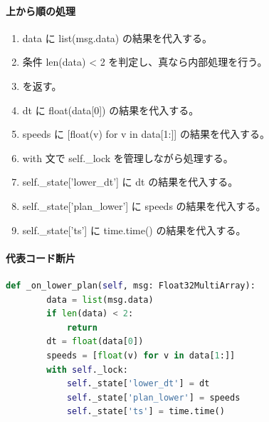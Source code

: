 \documentclass[a4paper,11pt]{article}
\begin{document}
            \paragraph{上から順の処理}
            \begin{enumerate}[leftmargin=1.8em]
            \item data に list(msg.data) の結果を代入する。
\item 条件 len(data) < 2 を判定し、真なら内部処理を行う。
\item    を返す。
\item dt に float(data[0]) の結果を代入する。
\item speeds に [float(v) for v in data[1:]] の結果を代入する。
\item with 文で self.\_lock を管理しながら処理する。
\item   self.\_state['lower\_dt'] に dt の結果を代入する。
\item   self.\_state['plan\_lower'] に speeds の結果を代入する。
\item   self.\_state['ts'] に time.time() の結果を代入する。
            \end{enumerate}
            \paragraph{代表コード断片}
            \begin{lstlisting}[language=Python]
    def _on_lower_plan(self, msg: Float32MultiArray):
        data = list(msg.data)
        if len(data) < 2:
            return
        dt = float(data[0])
        speeds = [float(v) for v in data[1:]]
        with self._lock:
            self._state['lower_dt'] = dt
            self._state['plan_lower'] = speeds
            self._state['ts'] = time.time()
\end{lstlisting}
\end{document}
